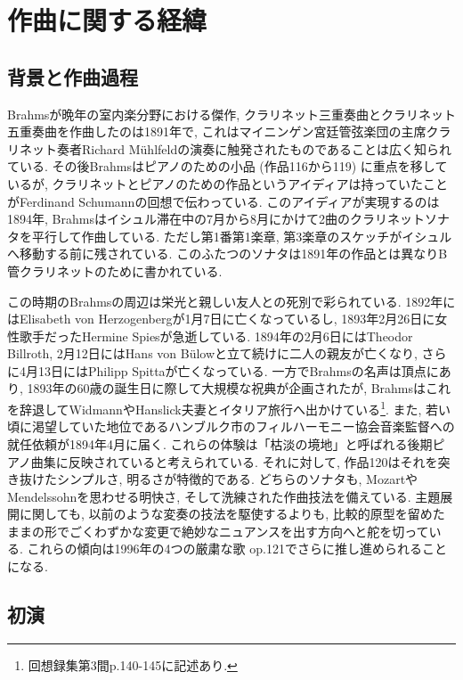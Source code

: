 
\chapter{作曲に関する経緯}

\section{背景と作曲過程}

Brahmsが晩年の室内楽分野における傑作, クラリネット三重奏曲とクラリネット五重奏曲を作曲したのは1891年で,
これはマイニンゲン宮廷管弦楽団の主席クラリネット奏者Richard Mühlfeldの演奏に触発されたものであることは広く知られている.
その後Brahmsはピアノのための小品 (作品116から119) に重点を移しているが,
クラリネットとピアノのための作品というアイディアは持っていたことがFerdinand Schumannの回想で伝わっている\cite{library}.
このアイディアが実現するのは1894年, Brahmsはイシュル滞在中の7月から8月にかけて2曲のクラリネットソナタを平行して作曲している\cite{compos}\cite{henle}.
ただし第1番第1楽章, 第3楽章のスケッチがイシュルへ移動する前に残されている\cite{library}\cite{henle}.
このふたつのソナタは1891年の作品とは異なりB管クラリネットのために書かれている.

この時期のBrahmsの周辺は栄光と親しい友人との死別で彩られている.
1892年にはElisabeth von Herzogenbergが1月7日に亡くなっているし, 1893年2月26日に女性歌手だったHermine Spiesが急逝している.
1894年の2月6日にはTheodor Billroth, 2月12日にはHans von Bülowと立て続けに二人の親友が亡くなり, さらに4月13日にはPhilipp Spittaが亡くなっている.
一方でBrahmsの名声は頂点にあり, 1893年の60歳の誕生日に際して大規模な祝典が企画されたが,
Brahmsはこれを辞退してWidmannやHanslick夫妻とイタリア旅行へ出かけている\footnote{回想録集第3間p.140-145に記述あり.}.
また, 若い頃に渇望していた地位であるハンブルク市のフィルハーモニー協会音楽監督への就任依頼が1894年4月に届く.
これらの体験は「枯淡の境地」と呼ばれる後期ピアノ曲集に反映されていると考えられている.
それに対して, 作品120はそれを突き抜けたシンプルさ, 明るさが特徴的である.
どちらのソナタも, MozartやMendelssohnを思わせる明快さ, そして洗練された作曲技法を備えている.
主題展開に関しても, 以前のような変奏の技法を駆使するよりも,
比較的原型を留めたままの形でごくわずかな変更で絶妙なニュアンスを出す方向へと舵を切っている.
これらの傾向は1996年の4つの厳粛な歌 op.121でさらに推し進められることになる.


\section{初演}

